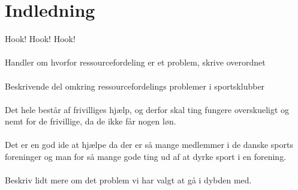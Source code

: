 \chapter{Indledning}\label{ch:introduction}
Hook! Hook! Hook!
\\
\\
Handler om hvorfor ressourcefordeling er et problem, skrive overordnet
\\
\\
Beskrivende del omkring ressourcefordelings problemer i sportsklubber
\\
\\
Det hele består af frivilliges hjælp, og derfor skal ting fungere overskueligt og nemt for de frivillige, da de ikke får nogen løn.
\\
\\
Det er en god ide at hjælpe da der er så mange medlemmer i de danske sports foreninger og man for så mange gode ting ud af at dyrke sport i en forening. 
\\
\\
Beskriv lidt mere om det problem vi har valgt at gå i dybden med.


